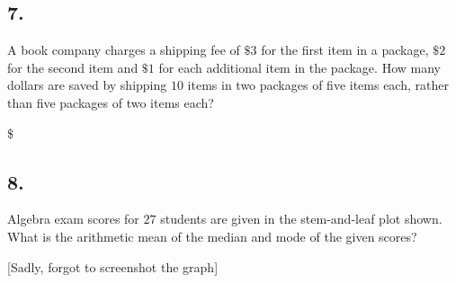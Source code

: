 \documentclass[12pt]{article}
\begin{document}
\subsection*{7.}
A book company charges a shipping fee of $\$3$ for the first item in a package, $\$2$ for the second item and $\$1$ for each additional item in the package. How many dollars are saved by shipping $10$ items in two packages of five items each, rather than five packages of two items each?

\$~\fbox{\phantom{ANSWER}}

\begin{answer}
%
\end{answer}


\subsection*{8.}
Algebra exam scores for $27$ students are given in the stem-and-leaf plot shown. What is the arithmetic mean of the median and mode of the given scores?

[Sadly, forgot to screenshot the graph]

\fbox{\phantom{ANSWER}}

\begin{answer}
%
\end{answer}
\end{document}

